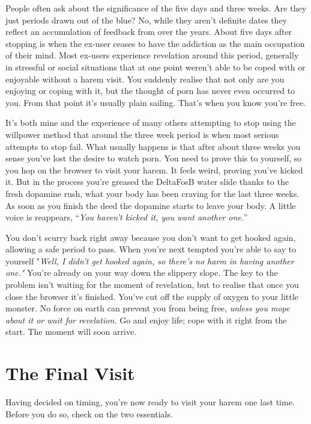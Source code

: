 \documentclass[
]{book}
\begin{document}
People often ask about the significance of the five days and three weeks. Are they just periods drawn out of the blue? No, while they aren't definite dates they reflect an accumulation of feedback from over the years. About five days after stopping is when the ex-user ceases to have the addiction as the main occupation of their mind. Most ex-users experience revelation around this period, generally in stressful or social situations that at one point weren't able to be coped with or enjoyable without a harem visit. You suddenly realise that not only are you enjoying or coping with it, but the thought of porn has never even occurred to you. From that point it's usually plain sailing. That's when you know you're free.

It's both mine and the experience of many others attempting to stop using the willpower method that around the three week period is when most serious attempts to stop fail. What usually happens is that after about three weeks you sense you've lost the desire to watch porn. You need to prove this to yourself, so you hop on the browser to visit your harem. It feels weird, proving you've kicked it. But in the process you're greased the DeltaFosB water slide thanks to the fresh dopamine rush, what your body has been craving for the last three weeks. As soon as you finish the deed the dopamine starts to leave your body. A little voice is reappears, ``\emph{You haven't kicked it, you want another one.}''

You don't scurry back right away because you don't want to get hooked again, allowing a safe period to pass. When you're next tempted you're able to say to yourself "\emph{Well, I didn't get hooked again, so there's no harm in having another one."} You're already on your way down the slippery slope. The key to the problem isn't waiting for the moment of revelation, but to realise that once you close the browser it's finished. You've cut off the supply of oxygen to your little monster. No force on earth can prevent you from being free, \emph{unless you mope about it or wait for revelation.} Go and enjoy life; cope with it right from the start. The moment will soon arrive.

\hypertarget{the-final-visit}{%
\chapter{The Final Visit}\label{the-final-visit}}

Having decided on timing, you're now ready to visit your harem one last time. Before you do so, check on the two essentials.
\end{document}
